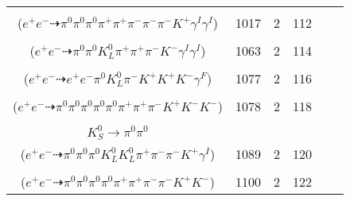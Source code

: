 \documentclass[landscape]{article}
\newcounter{rownumbers}
\newcommand\rn{\stepcounter{rownumbers}\arabic{rownumbers}}
\newcommand{\EOL}{\\} %
\newcommand{\topoTags}[1]{#1} %
\begin{document}
\begin{longtable}{clcccc}
\rn & \makecell[l]{ $ 
e^{+} e^{-} \rightarrow \pi^{+} \pi^{+} \pi^{-} \pi^{-} \rho^{-} \bar{K}^{0} K^{+} \gamma^{I} \gamma^{I} ,
\rho^{-} \rightarrow \pi^{0} \pi^{-} ,
\bar{K}^{0} \rightarrow K_{S}^{0} ,
K_{S}^{0} \rightarrow \pi^{0} \pi^{0} 
$ \\ ($
e^{+} e^{-} \dashrightarrow \pi^{0} \pi^{0} \pi^{0} \pi^{+} \pi^{+} \pi^{-} \pi^{-} \pi^{-} K^{+} \gamma^{I} \gamma^{I} 
$) } & \topoTags{1017 & }2 & 112 \EOL

\rn & \makecell[l]{ $ 
e^{+} e^{-} \rightarrow \pi^{0} \pi^{+} \pi^{-} K^{*+} K^{*-} \gamma^{I} \gamma^{I} ,
K^{*+} \rightarrow \pi^{+} K^{0} ,
K^{*-} \rightarrow \pi^{0} K^{-} ,
K^{0} \rightarrow K_{L}^{0} 
$ \\ ($
e^{+} e^{-} \dashrightarrow \pi^{0} \pi^{0} K_{L}^{0} \pi^{+} \pi^{+} \pi^{-} K^{-} \gamma^{I} \gamma^{I} 
$) } & \topoTags{1063 & }2 & 114 \EOL

\rn & \makecell[l]{ $ 
e^{+} e^{-} \rightarrow \pi^{0} K^{*+} K^{*-} \phi ,
K^{*+} \rightarrow \pi^{0} K^{+} ,
K^{*-} \rightarrow \pi^{-} \bar{K}^{0} ,
\phi \rightarrow K^{+} K^{-} ,
\pi^{0} \rightarrow e^{+} e^{-} \gamma^{F} ,
\bar{K}^{0} \rightarrow K_{L}^{0} 
$ \\ ($
e^{+} e^{-} \dashrightarrow e^{+} e^{-} \pi^{0} K_{L}^{0} \pi^{-} K^{+} K^{+} K^{-} \gamma^{F} 
$) } & \topoTags{1077 & }2 & 116 \EOL

\rn & \makecell[l]{ $ 
e^{+} e^{-} \rightarrow \pi^{+} \rho^{+} \rho^{-} K^{0} K^{+} K^{-} K^{-} ,
\rho^{+} \rightarrow \pi^{0} \pi^{+} ,
\rho^{-} \rightarrow \pi^{0} \pi^{-} ,
K^{0} \rightarrow K_{L}^{0} ,
K_{L}^{0} \rightarrow \pi^{0} \pi^{0} \pi^{0} 
$ \\ ($
e^{+} e^{-} \dashrightarrow \pi^{0} \pi^{0} \pi^{0} \pi^{0} \pi^{0} \pi^{+} \pi^{+} \pi^{-} K^{+} K^{-} K^{-} 
$) } & \topoTags{1078 & }2 & 118 \EOL

\rn & \makecell[l]{ $ 
e^{+} e^{-} \rightarrow \pi^{-} \rho^{-} \bar{K}^{0} \bar{K}^{0} K^{+} K^{*+} \gamma^{I} ,
\rho^{-} \rightarrow \pi^{0} \pi^{-} ,
\bar{K}^{0} \rightarrow K_{L}^{0} ,
\bar{K}^{0} \rightarrow K_{L}^{0} ,
K^{*+} \rightarrow \pi^{+} K^{0} ,
K^{0} \rightarrow K_{S}^{0} ,
$ \\ $
K_{S}^{0} \rightarrow \pi^{0} \pi^{0} 
$ \\ ($
e^{+} e^{-} \dashrightarrow \pi^{0} \pi^{0} \pi^{0} K_{L}^{0} K_{L}^{0} \pi^{+} \pi^{-} \pi^{-} K^{+} \gamma^{I} 
$) } & \topoTags{1089 & }2 & 120 \EOL

\rn & \makecell[l]{ $ 
e^{+} e^{-} \rightarrow \pi^{0} \pi^{0} \pi^{-} \rho^{+} \rho^{+} K^{*} K^{-} ,
\rho^{+} \rightarrow \pi^{0} \pi^{+} ,
\rho^{+} \rightarrow \pi^{0} \pi^{+} ,
K^{*} \rightarrow \pi^{-} K^{+} 
$ \\ ($
e^{+} e^{-} \dashrightarrow \pi^{0} \pi^{0} \pi^{0} \pi^{0} \pi^{+} \pi^{+} \pi^{-} \pi^{-} K^{+} K^{-} 
$) } & \topoTags{1100 & }2 & 122 \EOL


\end{longtable}
\end{document}
